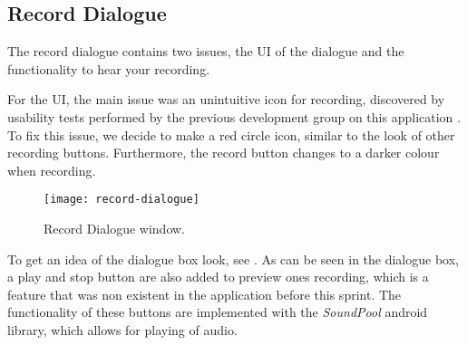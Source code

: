 \subsection{Record Dialogue}
The record dialogue contains two issues, the UI of the dialogue and the functionality to hear your recording.

For the UI, the main issue was an unintuitive icon for recording, discovered by usability tests performed by the previous development group on this application \citep{misc:crocold}. To fix this issue, we decide to make a red circle icon, similar to the look of other recording buttons. Furthermore, the record button changes to a darker colour when recording. 

\begin{figure}[h]
     \centering
     \texttt{[image: record-dialogue]}
     \caption{Record Dialogue window.}
     \label{fig:record-dialogue}
\end{figure}

To get an idea of the dialogue box look, see .
As can be seen in the dialogue box, a play and stop button are also added to preview ones recording, which is a feature that was non existent in the application before this sprint.
The functionality of these buttons are implemented with the \textit{SoundPool} android library, which allows for playing of audio.

